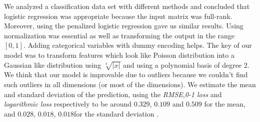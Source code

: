 \documentclass{article} %
\begin{document}
We analyzed a classification data set with different methods and concluded that logistic regression was appropriate because the input matrix was full-rank. Moreover, using the penalized logistic regression gave us similar results. Using normalization was essential as well as transforming the output in the range $[0,1]$. Adding categorical variables with dummy encoding helps. The key of our model was to transform features which look like Poisson distribution into a Gaussian like distribution using $\sqrt[4]{|x|}$ and using a polynomial basis of degree 2. We think that our model is improvable due to outliers because we couldn't find such outliers in all dimensions (or most of the dimensions). We estimate the mean and standard deviation of the prediction, using the \textit{RMSE},\textit{0-1 loss} and \textit{logarithmic loss} respectively to be around $0.329$, $0.109$ and $0.509$ for the mean, and $0.028$, $0.018$, $0.018$for the standard deviation .
\end{document}
